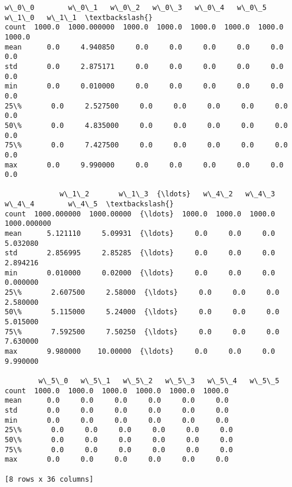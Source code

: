 \documentclass[11pt]{article}
\makeatletter
\newcommand{\boxspacing}{\kern\kvtcb@left@rule\kern\kvtcb@boxsep}
\newcommand{\prompt}[4]{
        \ttfamily\llap{{\color{#2}[#3]:\hspace{3pt}#4}}\vspace{-\baselineskip}
    }
\makeatother
\begin{document}
            \begin{tcolorbox}[breakable, size=fbox, boxrule=.5pt, pad at break*=1mm, opacityfill=0]
\prompt{Out}{outcolor}{22}{\boxspacing}
\begin{Verbatim}[commandchars=\\\{\}]
        w\_0\_0        w\_0\_1   w\_0\_2   w\_0\_3   w\_0\_4   w\_0\_5   w\_1\_0   w\_1\_1  \textbackslash{}
count  1000.0  1000.000000  1000.0  1000.0  1000.0  1000.0  1000.0  1000.0
mean      0.0     4.940850     0.0     0.0     0.0     0.0     0.0     0.0
std       0.0     2.875171     0.0     0.0     0.0     0.0     0.0     0.0
min       0.0     0.010000     0.0     0.0     0.0     0.0     0.0     0.0
25\%       0.0     2.527500     0.0     0.0     0.0     0.0     0.0     0.0
50\%       0.0     4.835000     0.0     0.0     0.0     0.0     0.0     0.0
75\%       0.0     7.427500     0.0     0.0     0.0     0.0     0.0     0.0
max       0.0     9.990000     0.0     0.0     0.0     0.0     0.0     0.0

             w\_1\_2       w\_1\_3  {\ldots}   w\_4\_2   w\_4\_3   w\_4\_4        w\_4\_5  \textbackslash{}
count  1000.000000  1000.00000  {\ldots}  1000.0  1000.0  1000.0  1000.000000
mean      5.121110     5.09931  {\ldots}     0.0     0.0     0.0     5.032080
std       2.856995     2.85285  {\ldots}     0.0     0.0     0.0     2.894216
min       0.010000     0.02000  {\ldots}     0.0     0.0     0.0     0.000000
25\%       2.607500     2.58000  {\ldots}     0.0     0.0     0.0     2.580000
50\%       5.115000     5.24000  {\ldots}     0.0     0.0     0.0     5.015000
75\%       7.592500     7.50250  {\ldots}     0.0     0.0     0.0     7.630000
max       9.980000    10.00000  {\ldots}     0.0     0.0     0.0     9.990000

        w\_5\_0   w\_5\_1   w\_5\_2   w\_5\_3   w\_5\_4   w\_5\_5
count  1000.0  1000.0  1000.0  1000.0  1000.0  1000.0
mean      0.0     0.0     0.0     0.0     0.0     0.0
std       0.0     0.0     0.0     0.0     0.0     0.0
min       0.0     0.0     0.0     0.0     0.0     0.0
25\%       0.0     0.0     0.0     0.0     0.0     0.0
50\%       0.0     0.0     0.0     0.0     0.0     0.0
75\%       0.0     0.0     0.0     0.0     0.0     0.0
max       0.0     0.0     0.0     0.0     0.0     0.0

[8 rows x 36 columns]
\end{Verbatim}
\end{tcolorbox}
        
    \begin{tcolorbox}[breakable, size=fbox, boxrule=1pt, pad at break*=1mm,colback=cellbackground, colframe=cellborder]
\prompt{In}{incolor}{ }{\boxspacing}
\begin{Verbatim}[commandchars=\\\{\}]

\end{Verbatim}
\end{tcolorbox}
\end{document}
